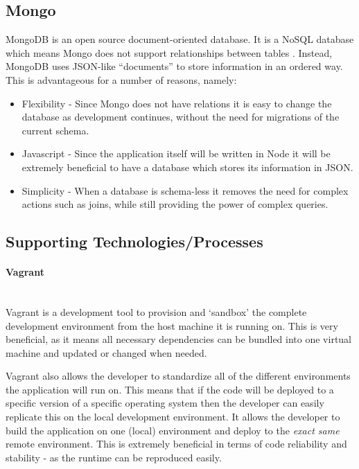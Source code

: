 \documentclass{article}
\begin{document}
\subsection{Mongo}
MongoDB is an open source document-oriented database. It is a NoSQL database which means Mongo does not support relationships between tables \citep{Mongo216}. Instead, MongoDB uses JSON-like ``documents'' to store information in an ordered way. This is advantageous for a number of reasons, namely:

\begin{itemize}
  \item Flexibility - Since Mongo does not have relations it is easy to change the database as development continues, without the need for migrations of the current schema.
  \item Javascript - Since the application itself will be written in Node it will be extremely beneficial to have a database which stores its information in JSON.
  \item Simplicity - When a database is schema-less it removes the need for complex actions such as joins, while still providing the power of complex queries.
\end{itemize}

\subsection{Supporting Technologies/Processes}
\label{subs:support}
\paragraph{Vagrant}\mbox{}\\
Vagrant is a development tool to provision and `sandbox' the complete development environment from the host machine it is running on. This is very beneficial, as it means all necessary dependencies can be bundled into one virtual machine and updated or changed when needed. 

Vagrant also allows the developer to standardize all of the different environments the application will run on. This means that if the code will be deployed to a specific version of a specific operating system then the developer can easily replicate this on the local development environment. It allows the developer to build the application on one (local) environment and deploy to the \textit{exact same} remote environment. This is extremely beneficial in terms of code reliability and stability - as the runtime can be reproduced easily.
\end{document}
